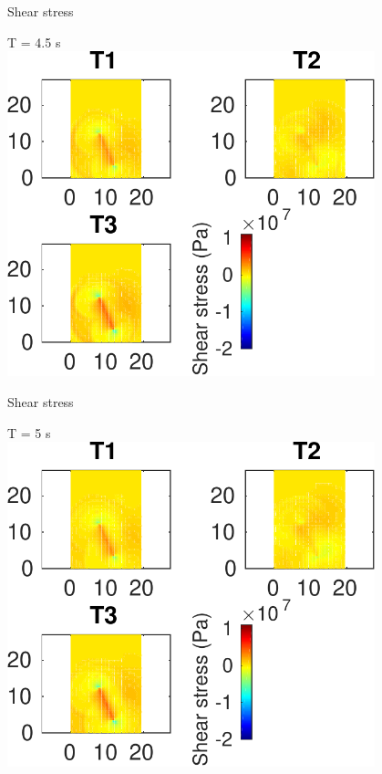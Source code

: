 \documentclass{beamer}
\begin{document}
\begin{frame}
 {Shear stress}
 
 \centering \Large T = 4.5 s\\
 \includegraphics[width=0.8\textwidth]{images/horizontal_00051}
 
\end{frame}

\begin{frame}
 {Shear stress}
 
 \centering \Large T = 5 s\\
 \includegraphics[width=0.8\textwidth]{images/horizontal_00056}
 
\end{frame}
\end{document}
